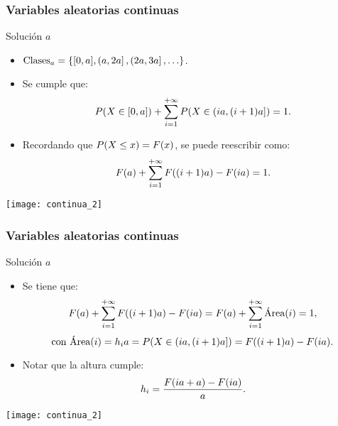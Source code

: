 \documentclass[table]{beamer}
\begin{document}
\begin{frame}
    \frametitle{Variables aleatorias continuas}
    \begin{block}{Solución $a$}
        \begin{itemize}
            \item $\text{Clases}_{a} = \bparens{\sparens{0 , a}, \left ( a , 2 a \right ] , \left ( 2 a , 3 a \right ] , \ldots}$.
            \item Se cumple que:
                \begin{equation*}
                    \prob{X \in \sparens{0, a}} + \sum_{i = 1}^{+ \infty} \prob{X \in \left ( i a, \parens{i + 1} a \right ]} = 1 .
                \end{equation*}
            \item Recordando que $\prob{X \leq x} = \FF{x}$, se puede reescribir como:
                \begin{equation*}
                    \FF{a} + \sum_{i = 1}^{+ \infty} \FF{\parens{i + 1} a} - \FF{i a} = 1 .
                \end{equation*}
        \end{itemize}
    \end{block}
    \begin{center}
        \texttt{[image: continua\_2]}
    \end{center}
\end{frame}



\begin{frame}
    \frametitle{Variables aleatorias continuas}
    \begin{block}{Solución $a$}
        \begin{itemize}
            \item Se tiene que:
                \begin{equation*}
                    \FF{a} + \sum_{i = 1}^{+ \infty} \FF{\parens{i + 1} a} - \FF{i a} =
                    \FF{a} + \sum_{i = 1}^{+ \infty} \text{Área} \parens{i} = 1 ,
                \end{equation*}
                \begin{equation*}
                    \text{con } \text{Área} \parens{i} = h_{i} a = \prob{X \in \left ( i a, \parens{i + 1} a \right ]} = \FF{\parens{i + 1} a} - \FF{i a} .
                \end{equation*}
            \item Notar que la altura cumple:
                \begin{equation*}
                    h_{i} = \frac{\FF{i a + a} - \FF{i a}}{a} .
                \end{equation*}
        \end{itemize}
    \end{block}
    \begin{center}
        \texttt{[image: continua\_2]}
    \end{center}
\end{frame}
\end{document}
